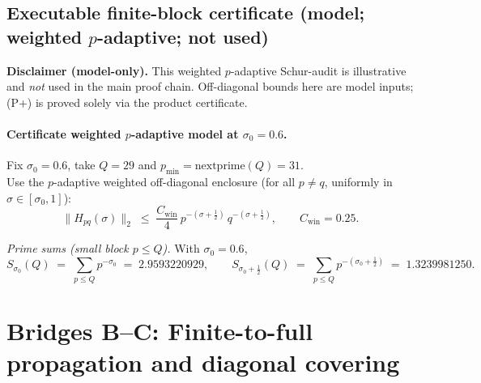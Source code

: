 \documentclass[11pt]{article}
\theoremstyle{definition}
\theoremstyle{remark}
\begin{document}
\subsection*{Executable finite-block certificate (model; weighted $p$-adaptive; not used)}
\noindent\textbf{Disclaimer (model-only).} This weighted $p$-adaptive Schur-audit is illustrative and \emph{not} used in the main proof chain. Off-diagonal bounds here are model inputs; (P+) is proved solely via the product certificate.

\paragraph*{Certificate \textemdash{} weighted \(p\)-adaptive model at \(\sigma_0=0.6\).}
Fix \(\sigma_0=0.6\), take \(Q=29\) and \(p_{\min}=\mathrm{nextprime}(Q)=31\).\\
Use the \(p\)-adaptive weighted off-diagonal enclosure (for all \(p\neq q\), uniformly in \(\sigma\in[\sigma_0,1]\)):
\[
\|H_{pq}(\sigma)\|_2 \;\le\; \frac{C_{\mathrm{win}}}{4}\, p^{-(\sigma+\tfrac12)}\, q^{-(\sigma+\tfrac12)},
\qquad C_{\mathrm{win}}=0.25.
\]

\noindent\emph{Prime sums (small block \(p\le Q\)).} With \(\sigma_0=0.6\),
\[
S_{\sigma_0}(Q)\;=\;\sum_{p\le Q} p^{-\sigma_0}\;=\;2.9593220929,\qquad
S_{\sigma_0+\tfrac12}(Q)\;=\;\sum_{p\le Q} p^{-(\sigma_0+\tfrac12)}\;=\;1.3239981250.
\]

\section{Bridges B--C: Finite-to-full propagation and diagonal covering}
\iffalse
\end{document}
